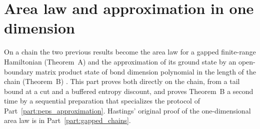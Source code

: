 \part{Area law and approximation in one dimension}
\label{part:one_dimensional_area_law}

On a chain the two previous results become the area law for a gapped
finite-range Hamiltonian (Theorem~A) and the approximation of its ground state
by an open-boundary matrix product state of bond dimension polynomial in the
length of the chain (Theorem~B) \cite{TNLean2026OneDimensional}. This part
proves both directly on the chain, from a tail bound at a cut and a buffered
entropy discount, and proves Theorem~B a second time by a sequential
preparation that specializes the protocol of
Part~\ref{part:peps_approximation}. Hastings' original proof of the
one-dimensional area law is in Part~\ref{part:gapped_chains}.

